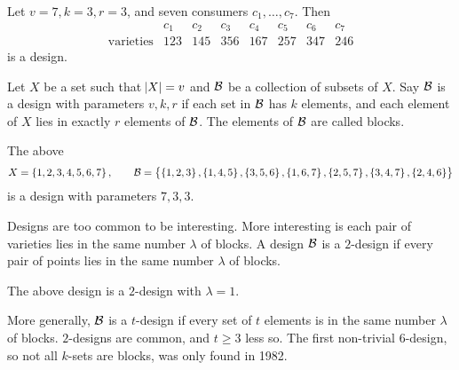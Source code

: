 \begin{example*}
Let $ v = 7, k = 3, r = 3 $, and seven consumers $ c_1, \dots, c_7 $. Then
$$
\begin{array}{c|ccccccc}
& c_1 & c_2 & c_3 & c_4 & c_5 & c_6 & c_7 \\
\hline
\text{varieties} & 123 & 145 & 356 & 167 & 257 & 347 & 246
\end{array}
$$
is a design.
\end{example*}

Let $ X $ be a set such that $ \abs{X} = v $ and $ \mathcal{B} $ be a collection of subsets of $ X $. Say $ \mathcal{B} $ is a design with parameters $ v, k, r $ if each set in $ \mathcal{B} $ has $ k $ elements, and each element of $ X $ lies in exactly $ r $ elements of $ \mathcal{B} $. The elements of $ \mathcal{B} $ are called blocks.

\begin{example*}
The above
$$ X = \cbr{1, 2, 3, 4, 5, 6, 7}, \qquad \BBB = \cbr{\cbr{1, 2, 3}, \cbr{1, 4, 5}, \cbr{3, 5, 6}, \cbr{1, 6, 7}, \cbr{2, 5, 7}, \cbr{3, 4, 7}, \cbr{2, 4, 6}} $$
is a design with parameters $ 7, 3, 3 $.
\end{example*}

Designs are too common to be interesting. More interesting is each pair of varieties lies in the same number $ \lambda $ of blocks. A design $ \mathcal{B} $ is a $ 2 $-design if every pair of points lies in the same number $ \lambda $ of blocks.

\begin{example*}
The above design is a $ 2 $-design with $ \lambda = 1 $.
\end{example*}

More generally, $ \mathcal{B} $ is a $ t $-design if every set of $ t $ elements is in the same number $ \lambda $ of blocks. $ 2 $-designs are common, and $ t \ge 3 $ less so. The first non-trivial $ 6 $-design, so not all $ k $-sets are blocks, was only found in 1982.

